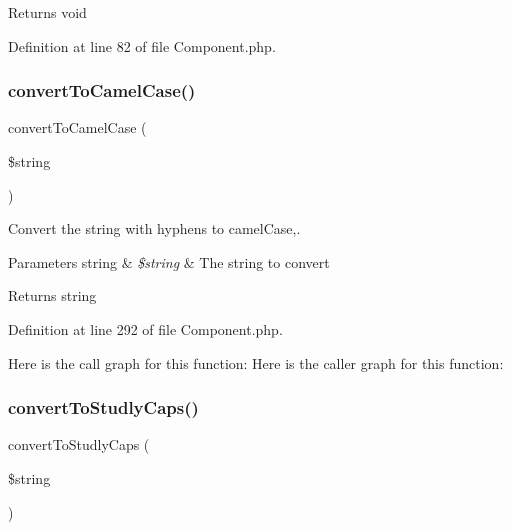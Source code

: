 \begin{DoxyReturn}{Returns}
void 
\end{DoxyReturn}


Definition at line 82 of file Component.\+php.

\mbox{\label{class_zest_1_1_component_1_1_component_ac8113e94342833c6df305638210875f5}} 
\subsubsection{\texorpdfstring{convert\+To\+Camel\+Case()}{convertToCamelCase()}}
{\footnotesize\ttfamily convert\+To\+Camel\+Case (\begin{DoxyParamCaption}\item[{}]{\$string }\end{DoxyParamCaption})\hspace{0.3cm}{\ttfamily [protected]}}

Convert the string with hyphens to camel\+Case,.


\begin{DoxyParams}[1]{Parameters}
string & {\em \$string} & The string to convert\\
\hline
\end{DoxyParams}
\begin{DoxyReturn}{Returns}
string 
\end{DoxyReturn}


Definition at line 292 of file Component.\+php.

Here is the call graph for this function\+:
Here is the caller graph for this function\+:
\mbox{\label{class_zest_1_1_component_1_1_component_a6201cf73444ddfadfca25d437f49fd1b}} 
\subsubsection{\texorpdfstring{convert\+To\+Studly\+Caps()}{convertToStudlyCaps()}}
{\footnotesize\ttfamily convert\+To\+Studly\+Caps (\begin{DoxyParamCaption}\item[{}]{\$string }\end{DoxyParamCaption})\hspace{0.3cm}{\ttfamily [protected]}}

